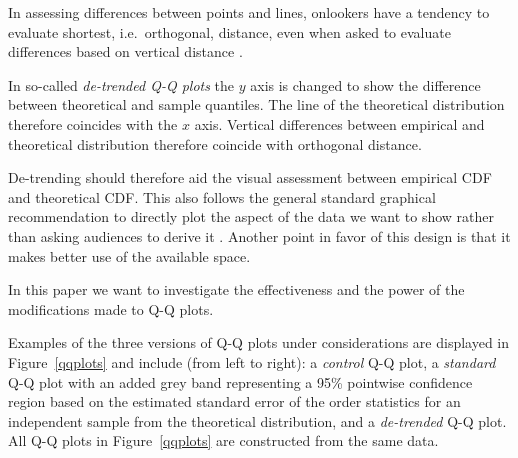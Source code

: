 \documentclass{article}\usepackage[]{graphicx}\usepackage[]{color}
\newcommand{\alnote}[1]{\todo[inline,color=green!40]{#1}}
\begin{document}
In assessing differences between points and lines, onlookers have a tendency to evaluate shortest, i.e.~orthogonal, distance, even when asked to evaluate differences based on vertical distance \citep{sineillusion, robbins:2005, cleveland:1984}. 

In so-called {\it de-trended Q-Q plots} the $y$ axis is changed to show the difference between theoretical and sample quantiles. The line of the theoretical distribution therefore coincides with the $x$ axis. Vertical differences between empirical and theoretical distribution therefore  coincide with orthogonal distance. 

De-trending should therefore aid the visual assessment between empirical CDF and theoretical CDF. This also follows the general standard graphical recommendation to directly plot the aspect of the data we want to show rather than asking audiences to derive it \citep{wainer:2000}.  Another point in favor of this design is that it makes better use of the available space.



In this paper we want to investigate the effectiveness and the power of the modifications made to Q-Q plots.


Examples of the three versions of Q-Q plots under considerations are displayed in Figure~\ref{qqplots} and include (from left to right): a \emph{control} Q-Q plot, a \emph{standard} Q-Q plot with an added grey band representing a 95\% pointwise confidence region \citep{Davison:1997}
based on the estimated standard error of the order statistics for an independent sample from the theoretical distribution, and a \emph{de-trended} Q-Q plot. All Q-Q plots in Figure~\ref{qqplots} are constructed from the same data. 
\end{document}

